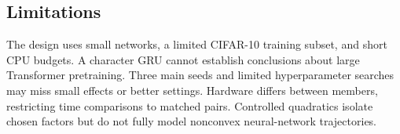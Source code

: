 \subsection{Limitations}
The design uses small networks, a limited CIFAR-10 training subset, and short CPU budgets.
A character GRU cannot establish conclusions about large Transformer pretraining.
Three main seeds and limited hyperparameter searches may miss small effects or better settings.
Hardware differs between members, restricting time comparisons to matched pairs. Controlled
quadratics isolate chosen factors but do not fully model nonconvex neural-network trajectories.
